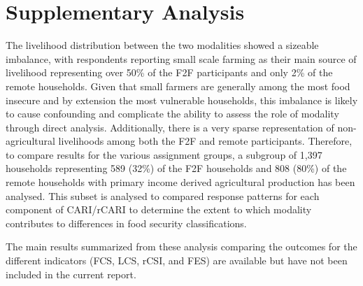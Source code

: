 \documentclass[11pt,harvard]{article}
\begin{document}
	\section{Supplementary Analysis}
	
	
	The livelihood distribution between the two modalities showed a sizeable imbalance, with respondents reporting small scale farming as their main source of livelihood representing over 50\% of the F2F participants and only 2\% of the remote households. Given that small farmers are generally among the most food insecure and by extension the most vulnerable households, this imbalance is likely to cause confounding and complicate the ability to assess the role of modality through direct analysis. Additionally, there is a very sparse representation of non-agricultural livelihoods among both the F2F and remote participants. Therefore, to compare results for the various assignment groups, a subgroup of 1,397 households representing 589 (32\%) of the F2F households and 808 (80\%) of the remote households with primary income derived agricultural production has been analysed. This subset is analysed to compared response patterns for each component of CARI/rCARI to determine the extent to which modality contributes to differences in food security classifications. 
	
	The main results summarized from these analysis comparing the outcomes for the different indicators (FCS, LCS, rCSI, and FES) are available but have not been included in the current report.
	
\end{document}
